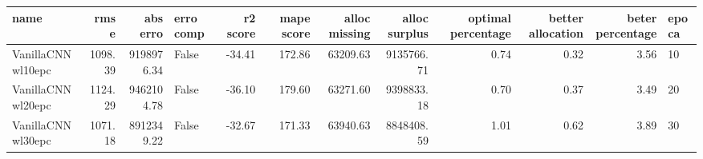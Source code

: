 \begin{tabular}{lrrlrrrrrrrl}
\toprule
name & rmse & abs erro & erro comp & r2 score & mape score & alloc missing & alloc surplus & optimal percentage & better allocation & beter percentage & epoca \\
\midrule
VanillaCNNwl10epc & 1098.39 & 9198976.34 & False & -34.41 & 172.86 & 63209.63 & 9135766.71 & 0.74 & 0.32 & 3.56 & 10 \\
VanillaCNNwl20epc & 1124.29 & 9462104.78 & False & -36.10 & 179.60 & 63271.60 & 9398833.18 & 0.70 & 0.37 & 3.49 & 20 \\
VanillaCNNwl30epc & 1071.18 & 8912349.22 & False & -32.67 & 171.33 & 63940.63 & 8848408.59 & 1.01 & 0.62 & 3.89 & 30 \\
\bottomrule
\end{tabular}
